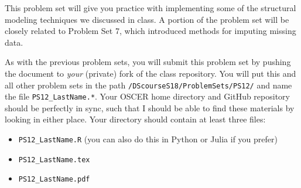 \documentclass[12pt,english]{exam}
\begin{document}
This problem set will give you practice with implementing some of the structural modeling techniques we discussed in class. A portion of the problem set will be closely related to Problem Set 7, which introduced methods for imputing missing data.

As with the previous problem sets, you will submit this problem set by pushing the document to \emph{your} (private) fork of the class repository. You will put this and all other problem sets in the path \texttt{/DScourseS18/ProblemSets/PS12/} and name the file \texttt{PS12\_LastName.*}. Your OSCER home directory and GitHub repository should be perfectly in sync, such that I should be able to find these materials by looking in either place. Your directory should contain at least three files:
\begin{itemize}
    \item \texttt{PS12\_LastName.R} (you can also do this in Python or Julia if you prefer)
    \item \texttt{PS12\_LastName.tex}
    \item \texttt{PS12\_LastName.pdf}
\end{itemize}
\end{document}
